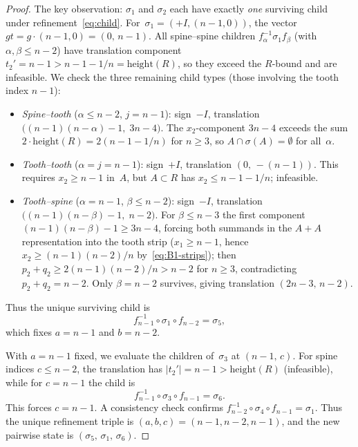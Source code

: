 \documentclass{amsart}
\theoremstyle{definition}
\theoremstyle{remark}
\begin{document}
\begin{proof}
The key observation: $\sigma_1$ and $\sigma_2$ each have exactly
\emph{one} surviving child under refinement~\eqref{eq:child}.
For~$\sigma_1 = (+I, (n{-}1, 0))$, the vector $gt = g \cdot (n{-}1, 0) =
(0,\, n{-}1)$.  All spine--spine children
$f_\alpha^{-1} \sigma_1 f_\beta$ (with $\alpha, \beta \le n{-}2$)
have translation component
$t_2' = n{-}1 > n{-}1{-}1/n = \mathrm{height}(R)$,
so they exceed the $R$-bound
and are infeasible.  We check the three remaining child types
(those involving the tooth index $n{-}1$):
\begin{itemize}
\item \emph{Spine--tooth} ($\alpha \le n{-}2$, $j = n{-}1$):
  sign~$-I$, translation $\bigl((n{-}1)(n{-}\alpha)-1,\; 3n{-}4\bigr)$.
  The $x_2$-component $3n{-}4$ exceeds the sum
  $2 \cdot \mathrm{height}(R) = 2(n{-}1{-}1/n)$ for $n \ge 3$,
  so $A \cap \sigma(A) = \emptyset$ for all~$\alpha$.
\item \emph{Tooth--tooth} ($\alpha = j = n{-}1$):
  sign~$+I$, translation $(0,\,{-}(n{-}1))$.
  This requires $x_2 \ge n{-}1$ in~$A$, but
  $A \subset R$ has $x_2 \le n{-}1{-}1/n$; infeasible.
\item \emph{Tooth--spine} ($\alpha = n{-}1$, $\beta \le n{-}2$):
  sign~$-I$, translation $\bigl((n{-}1)(n{-}\beta)-1,\; n{-}2\bigr)$.
  For $\beta \le n{-}3$ the first component
  $(n{-}1)(n{-}\beta)-1 \ge 3n{-}4$, forcing both summands in the
  $A + A$ representation into the tooth strip
  ($x_1 \ge n{-}1$, hence $x_2 \ge (n{-}1)(n{-}2)/n$
  by~\eqref{eq:B1-strips}); then
  $p_2 + q_2 \ge 2(n{-}1)(n{-}2)/n > n{-}2$ for $n \ge 3$,
  contradicting $p_2 + q_2 = n{-}2$.
  Only $\beta = n{-}2$ survives, giving translation $(2n{-}3,\,n{-}2)$.
\end{itemize}
Thus the unique surviving child is
\[
  f_{n-1}^{-1} \circ \sigma_1 \circ f_{n-2} = \sigma_5,
\]
which fixes $a = n{-}1$ and $b = n{-}2$.

With $a = n{-}1$ fixed, we evaluate the children of~$\sigma_3$
at $(n{-}1,\, c)$.  For spine indices $c \le n{-}2$, the
translation has $|t_2'| = n{-}1 > \mathrm{height}(R)$ (infeasible),
while for $c = n{-}1$ the child is
\[
  f_{n-1}^{-1} \circ \sigma_3 \circ f_{n-1} = \sigma_6.
\]
This forces $c = n{-}1$.  A consistency check confirms
$f_{n-2}^{-1} \circ \sigma_4 \circ f_{n-1} = \sigma_1$.
Thus the unique refinement triple is $(a, b, c) = (n{-}1, n{-}2,
n{-}1)$, and the new pairwise state is $(\sigma_5,\, \sigma_1,\,
\sigma_6)$.


\end{proof}
\end{document}
